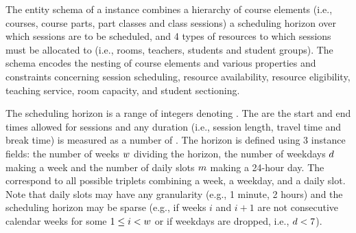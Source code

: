
The entity schema 
of a \UTP{} instance
combines
a hierarchy of course elements %
(i.e., courses, course parts, part classes and class sessions)
a scheduling horizon over which sessions are to be scheduled,
and 4 types of resources to which sessions must be allocated to
(i.e., rooms, teachers, students and student groups).
The schema encodes the nesting of course elements
and various properties and constraints 
concerning 
session scheduling,
resource availability, 
resource eligibility,
teaching service,
room capacity,
and student sectioning. %

The scheduling horizon is a range
of integers denoting \timepoints{}.
The \timepoints{} are the start and end times allowed for sessions
and any duration (i.e., session length, travel time and break time)
is measured as a number of \timepoints{}. 
The horizon is
defined using 3 instance fields: 
the number of weeks $w$ dividing the horizon, 
the number of weekdays $d$ making a week 
and the number of daily slots $m$ making a 24-hour day.
The \timepoints{} correspond to all possible triplets combining a week, a weekday, and a daily slot. 
Note that daily slots may have any granularity (e.g., 1 minute, 2 hours)
and
the scheduling horizon may be sparse
(e.g., if weeks $i$ and $i+1$ are not consecutive calendar weeks for some $1\leq i<w$ 
or if weekdays are dropped, i.e., $d<7$).

